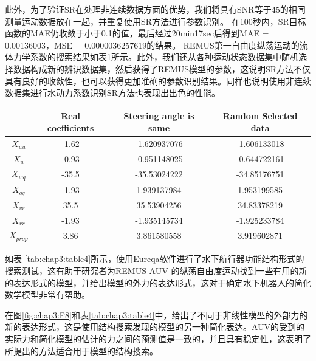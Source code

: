 此外，为了验证SR在处理非连续数据方面的优势，我们将具有SNR等于45的相同测量运动数据放在一起，并重复使用SR方法进行参数识别。 在100秒内，SR目标函数的MAE仍收敛于小于0.1的值，最后经过20min17sec后得到MAE = 0.00136003，MSE = 0.0000036257619的结果。 REMUS第一自由度纵荡运动的流体力学系数的搜索结果如表\ref{tab:chap3:table3}所示。此外，我们还从各种运动状态数据集中随机选择数据构成新的辨识数据集，然后获得了REMUS模型的参数，这说明SR方法不仅 具有良好的收敛性，也可以获得更加准确的参数识别结果。同样也说明使用非连续数据集进行水动力系数识别SR方法也表现出出色的性能。

\begin{table}
\centering
\label{tab:chap3:table3}
\begin{tabular}{cccc}
\toprule
             &Real coefficients & Steering angle is same & Random Selected data\\
\midrule
 $X_{uu}$    & -1.62 &-1.620937076   & -1.606133018 \\
 $X_{\dot u} $   &-0.93  &-0.951148025   & -0.644722161 \\
 $X_{wq}$    &-35.5  & -35.53024222  & -34.85176751  \\
 $X_{qq}$    &-1.93  &  1.939137984  &1.953199585   \\
 $X_{vr}$    &35.5   & 35.53904256   &34.83378219  \\
 $X_{rr}$    &-1.93  &  -1.935145734 &-1.925233784  \\
 $X_{prop}$    &3.86   & 3.861580558   &3.919602871  \\
\bottomrule
\end{tabular}
\end{table}

如表 \ref{tab:chap3:table4}所示，使用Eureqa软件进行了水下航行器功能结构形式的搜索测试，这有助于研究者为REMUS AUV 的纵荡自由度运动找到一些有用的新的表达形式的模型，并给出模型的外力的表达形式，这对于确定水下机器人的简化数学模型非常有帮助。

在图\ref{fig:chap3:F8}和表\ref{tab:chap3:table4}中，给出了不同于非线性模型的外部力的新的表达形式，这是使用结构搜索发现的模型的另一种简化表达。AUV的受到的实际力和简化模型的估计的力之间的预测值是一致的，并且具有稳定性，这表明了所提出的方法适合用于模型的结构搜索。

